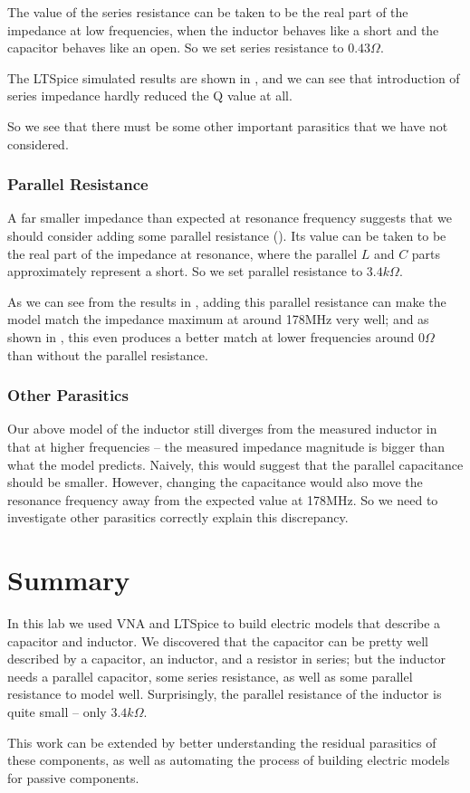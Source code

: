 \documentclass{article}
\begin{document}
The value of the series resistance can be taken to be the real part of the impedance at low frequencies, when the inductor behaves like a short and the capacitor behaves like an open.
So we set series resistance to $0.43\Omega$.

The LTSpice simulated results are shown in , and we can see that introduction of series impedance hardly reduced the Q value at all.

So we see that there must be some other important parasitics that we have not considered.

\subsubsection{Parallel Resistance}

A far smaller impedance than expected at resonance frequency suggests that we should consider adding some parallel resistance ().
Its value can be taken to be the real part of the impedance at resonance, where the parallel $L$ and $C$ parts approximately represent a short.
So we set parallel resistance to $3.4k\Omega$.

As we can see from the results in , adding this parallel resistance can make the model match the impedance maximum at around 178MHz very well;
and as shown in , this even produces a better match at lower frequencies around $0\Omega$ than without the parallel resistance.

\subsubsection{Other Parasitics}
Our above model of the inductor still diverges from the measured inductor in that at higher frequencies -- the measured impedance magnitude is bigger than what the model predicts.
Naively, this would suggest that the parallel capacitance should be smaller.
However, changing the capacitance would also move the resonance frequency away from the expected value at 178MHz.
So we need to investigate other parasitics correctly explain this discrepancy.

\section{Summary}
In this lab we used VNA and LTSpice to build electric models that describe a capacitor and inductor.
We discovered that the capacitor can be pretty well described by a capacitor, an inductor, and a resistor in series; but the inductor needs a parallel capacitor, some series resistance, as well as some parallel resistance to model well.
Surprisingly, the parallel resistance of the inductor is quite small -- only $3.4k\Omega$.

This work can be extended by better understanding the residual parasitics of these components, as well as automating the process of building electric models for passive components.
\end{document}
